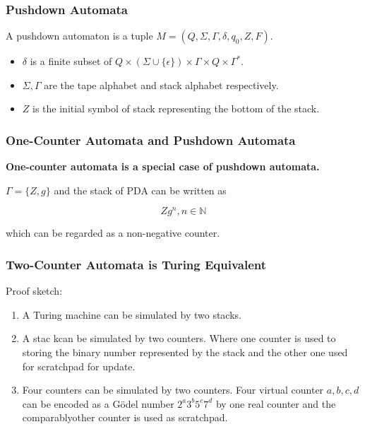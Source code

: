 \documentclass[11pt]{beamer}
\begin{document}
\iffalse
\begin{frame}\frametitle{Pushdown Automata}
\begin{definition}[PDA]
A pushdown automaton is a tuple $M = (Q, \Sigma, \Gamma, \delta, q_0, Z, F)$.
\begin{itemize}
\item $\delta$ is a finite subset of $Q\times (\Sigma \cup \{\epsilon\}) \times \Gamma \times Q \times \Gamma^*$.
\item $\Sigma, \Gamma$ are the tape alphabet and stack alphabet respectively.
\item $Z$ is the initial symbol of stack representing the bottom of the stack.
\end{itemize}

\end{definition}

\end{frame}
\begin{frame}\frametitle{One-Counter Automata and Pushdown Automata}

\textbf{One-counter automata is a special case of pushdown automata.}

$\Gamma = \{Z, g\}$ and the stack of PDA can be written as 

\[Zg^n, n\in \mathbb{N}\]

which can be regarded as a non-negative counter.



\end{frame}


\begin{frame}\frametitle{Two-Counter Automata is Turing Equivalent}
Proof sketch:
\begin{enumerate}
\item A Turing machine can be simulated by two stacks.
\item A stac kcan be simulated by two counters. Where one counter is used to storing the binary number represented by the stack and the other one used for scratchpad for update. 

\item Four counters can be simulated by two counters. Four virtual counter $a,b,c,d$ can be encoded as a G\"odel number $2^a3^b5^c7^d$ by one real counter and the comparablyother counter is used as scratchpad.
\end{enumerate}
\end{frame}
\end{document}
